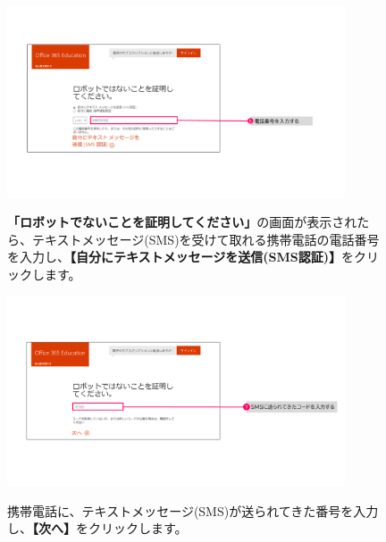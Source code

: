 \begin{figure}[h]
    \begin{minipage}{0.6\textwidth}
        \includegraphics[width=10cm]{figures/O365A1_submission04.png}
    \end{minipage}
    \begin{minipage}{0.4\textwidth}
       \textbf{「ロボットでないことを証明してください」}の画面が表示されたら、テキストメッセージ(SMS)を受けて取れる携帯電話の電話番号を入力し、\textbf{【自分にテキストメッセージを送信(SMS認証)】}をクリックします。
    \end{minipage}
\end{figure}

\begin{figure}[h]
    \begin{minipage}{0.6\textwidth}
        \includegraphics[width=10cm]{figures/O365A1_submission05.png}
    \end{minipage}
    \begin{minipage}{0.4\textwidth}
       携帯電話に、テキストメッセージ(SMS)が送られてきた番号を入力し、\textbf{【次へ】}をクリックします。
    \end{minipage}
\end{figure}

